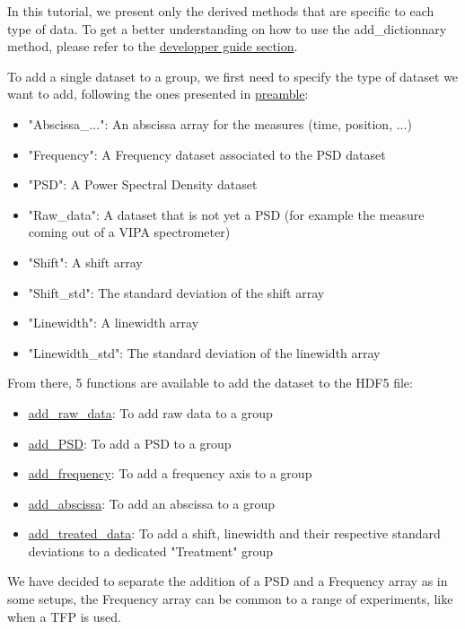 In this tutorial, we present only the derived methods that are specific to each type of data. To get a better understanding on how to use the add\_dictionnary method, please refer to the \hyperref[subsec:wrapper.add_dictionnary]{developper guide section}.

To add a single dataset to a group, we first need to specify the type of dataset we want to add, following the ones presented in \hyperref[subsec:preamble.file_structure.complete_structure]{preamble}:
\begin{itemize}
    \item "Abscissa\_...": An abscissa array for the measures (time, position, ...)
    \item "Frequency": A Frequency dataset associated to the PSD dataset
    \item "PSD": A Power Spectral Density dataset
    \item "Raw\_data": A dataset that is not yet a PSD (for example the measure coming out of a VIPA spectrometer)
    \item "Shift": A shift array
    \item "Shift\_std": The standard deviation of the shift array
    \item "Linewidth": A linewidth array
    \item "Linewidth\_std": The standard deviation of the linewidth array
\end{itemize}

From there, 5 functions are available to add the dataset to the HDF5 file:
\begin{itemize}
    \item \hyperref[subsec:wrapper.add_raw_data]{add\_raw\_data}: To add raw data to a group
    \item \hyperref[subsec:wrapper.add_psd]{add\_PSD}: To add a PSD to a group
    \item \hyperref[subsec:wrapper.add_frequency]{add\_frequency}: To add a frequency axis to a group
    \item \hyperref[subsec:wrapper.add_abscissa]{add\_abscissa}: To add an abscissa to a group
    \item \hyperref[subsec:wrapper.add_treated_data]{add\_treated\_data}: To add a shift, linewidth and their respective standard deviations to a dedicated "Treatment" group
\end{itemize}

We have decided to separate the addition of a PSD and a Frequency array as in some setups, the Frequency array can be common to a range of experiments, like when a TFP is used.

